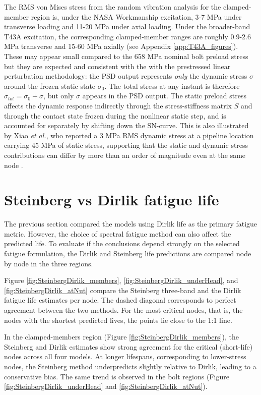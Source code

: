 \documentclass[a4paper,twoside]{bth}
\begin{document}
The \ac{RMS} von Mises stress from the random vibration analysis for the clamped-member region is, under the NASA Workmanship excitation, 3-7 MPa under transverse loading and 11-20 MPa under axial loading. Under the broader-band T43A excitation, the corresponding clamped-member ranges are roughly 0.9-2.6 MPa transverse and 15-60 MPa axially (see Appendix \ref{app:T43A_figures}). These may appear small compared to the 658 MPa nominal bolt preload stress but they are expected and consistent with the with the prestressed linear perturbation methodology: the \ac{PSD} output represents \textit{only} the dynamic stress $\sigma$ around the frozen static state $\sigma_0$. The total stress at any instant is therefore $\sigma_{tot} = \sigma_0 + \sigma$, but only $\sigma$ appears in the \ac{PSD} output. The static preload stress affects the dynamic response indirectly through the stress-stiffness matrix $S$ and through the contact state frozen during the nonlinear static step, and is accounted for separately by shifting down the SN-curve. This is also illustrated by Xiao \textit{et al.}, who reported a 3 MPa \ac{RMS} dynamic stress at a pipeline location carrying 45 MPa of static stress, supporting that the static and dynamic stress contributions can differ by more than an order of magnitude even at the same node \cite{48}.

\section{Steinberg vs Dirlik fatigue life}

The previous section compared the models using Dirlik life as the primary fatigue metric. However, the choice of spectral fatigue method can also affect the predicted life. To evaluate if the conclusions depend strongly on the selected fatigue formulation, the Dirlik and Steinberg life predictions are compared node by node in the three regions.

Figure \ref{fig:SteinbergDirlik_members}, \ref{fig:SteinbergDirlik_underHead}, and  \ref{fig:SteinbergDirlik_atNut} compare the Steinberg three-band and the Dirlik fatigue life estimates per node.
The dashed diagonal corresponds to perfect agreement between the two methods. For the most critical nodes, that is, the nodes with the shortest predicted lives, the points lie close to the 1:1 line.

In the clamped-members region (Figure \ref{fig:SteinbergDirlik_members}), the Steinberg and Dirlik estimates show strong agreement for the critical (short-life) nodes across all four models. At longer lifespans, corresponding to lower-stress nodes, the Steinberg method underpredicts slightly relative to Dirlik, leading to a conservative bias. The same trend is observed in the bolt regions (Figure \ref{fig:SteinbergDirlik_underHead} and \ref{fig:SteinbergDirlik_atNut}).
\end{document}

